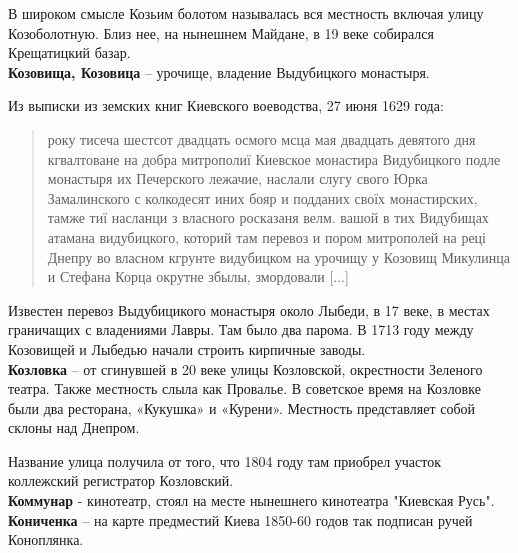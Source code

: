 В широком смысле Козьим болотом называлась вся местность включая улицу Козоболотную. Близ нее, на нынешнем Майдане, в 19 веке собирался Крещатицкий базар.\\


\textbf{Козовища, Козовица} – урочище, владение Выдубицкого монастыря.

Из выписки из земских книг Киевского воеводства, 27 июня 1629 года:

\begin{quotation}
року тисеча шестсот двадцать осмого мсца мая двадцать девятого дня кгвалтоване на добра митрополиї Киевское монастира Видубицкого подле монастыря их Печерского лежачие, наслали слугу свого Юрка Замалинского с колкодесят иних бояр и подданих своїх монастирских, тамже тиї насланци з власного росказаня велм. вашой в тих Видубищах атамана видубицкого, которий там перевоз и пором митрополей на реці Днепру во власном кгрунте видубицком на урочищу у Козовищ Микулинца и Стефана Корца окрутне збылы, змордовали [...] 
\end{quotation}


Известен перевоз Выдубицикого монастыря около Лыбеди, в 17 веке, в местах граничащих с владениями Лавры. Там было два парома. В 1713 году между Козовищей и Лыбедью начали строить кирпичные заводы.\\


\textbf{Козловка} – от сгинувшей в 20 веке улицы Козловской, окрестности Зеленого театра. Также местность слыла как Провалье. В советское время на Козловке были два ресторана, «Кукушка» и «Курени». Местность представляет собой склоны над Днепром.

Название улица получила от того, что 1804 году там приобрел участок коллежский регистратор Козловский.\\

\textbf{Коммунар} - кинотеатр, стоял на месте нынешнего кинотеатра "Киевская Русь".\\

\textbf{Кониченка} – на карте предместий Киева 1850-60 годов так подписан ручей Коноплянка.\\

